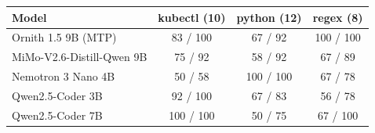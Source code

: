\begin{tabular}{lccc}\toprule Model & kubectl (10) & python (12) & regex (8)\\\midrule
Ornith 1.5 9B (MTP) & 83 / 100 & 67 / 92 & 100 / 100 \\
MiMo-V2.6-Distill-Qwen 9B & 75 / 92 & 58 / 92 & 67 / 89 \\
Nemotron 3 Nano 4B & 50 / 58 & 100 / 100 & 67 / 78 \\
Qwen2.5-Coder 3B & 92 / 100 & 67 / 83 & 56 / 78 \\
Qwen2.5-Coder 7B & 100 / 100 & 50 / 75 & 67 / 100 \\
\bottomrule\end{tabular}
